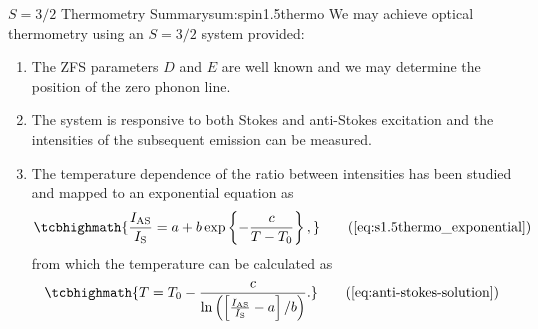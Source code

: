 



\begin{summary}{$S=3/2$ Thermometry Summary}{sum:spin1.5thermo}
	We may achieve optical thermometry using an $S = 3/2$ system provided:
	\begin{enumerate}
		\item The ZFS parameters $D$ and $E$ are well known and we may determine the position of the zero phonon line.
		\item The system is responsive to both Stokes and anti-Stokes excitation and the intensities of the subsequent emission can be measured.
		\item The temperature dependence of the ratio between intensities has been studied and mapped to an exponential equation as             \begin{equation}
			      \tcbhighmath{
				      \frac{I_{\ce{AS}}}{I_{\ce{S}}} = a +  b\exp\left\{-\frac{c}{T - T_0} \right\},
			      }
			      \tag{\ref{eq:s1.5thermo_exponential}}
		      \end{equation}
		      from which the temperature can be calculated as
            \begin{equation}
			      \tcbhighmath{
				      T = T_0 - \frac{c}{\ln\left(\left[{\frac{I_{\ce{AS}}}{I_{\ce{S}}} - a}\right]/b\right)}.
			      }
			      \tag{\ref{eq:anti-stokes-solution}}
		      \end{equation}


	\end{enumerate}
\end{summary}

